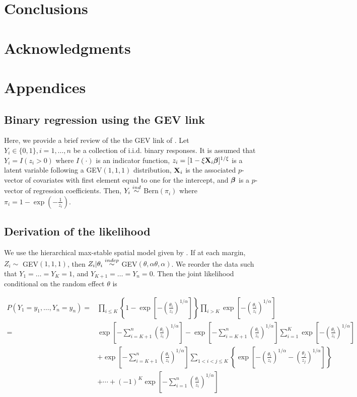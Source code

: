\documentclass[11pt]{article}
\begin{document}
\section{Conclusions}\label{rbs:conclusions}

\section*{Acknowledgments}

\appendix
\section{Appendices}
\subsection{Binary regression using the GEV link} \label{rba:rarebinary}
Here, we provide a brief review of the the GEV link of \citet{Wang2010}.
Let $Y_i \in \{0, 1\}, i = 1, \ldots, n$ be a collection of i.i.d. binary responses.
It is assumed that $Y_i = I(z_i > 0)$ where $I(\cdot)$ is an indicator function, $z_i = [1 - \xi \mbox{\bf X}_i \mbox{\boldmath $\beta$}]^{1 / \xi}$ is a latent variable following a GEV$(1, 1, 1)$ distribution, $\mbox{\bf X}_i$ is the associated $p$-vector of covariates with first element equal to one for the intercept, and $\mbox{\boldmath $\beta$}$ is a $p$-vector of regression coefficients.
Then, $Y_i \stackrel{ind}{\sim}$ Bern$(\pi_i)$ where $\pi_i= 1 - \exp \left( -\frac{ 1 }{ z_i } \right)$.


\subsection{Derivation of the likelihood} \label{rba:likelihoodderivation}
We use the hierarchical max-stable spatial model given by \citet{Reich2012}. If at each margin, $Z_i \sim $ GEV$(1,1,1)$, then $Z_i | \theta_i \stackrel{indep}{\sim} $ GEV$(\theta, \alpha \theta, \alpha)$. We reorder the data such that $Y_1=\ldots=Y_K=1$, and $Y_{K+1} = \ldots = Y_n = 0$. Then the joint likelihood conditional on the random effect $\theta$ is

\begin{align} \label{rbeq:joint_cond}
	P(Y_1=y_1,\ldots,Y_n=y_n) =& \prod_{ i \le K } \left\{ 1 - \exp \left[ - \left( \frac{ \theta_i }{ z_i } \right)^{ 1/\alpha} \right] \right \} \prod_{ i > K } \exp \left[ -\left( \frac{ \theta_i }{ z_i } \right)^{1/\alpha} \right] \nonumber \\[0.5em]
		=& \exp \left[ -\sum_{ i = K+1}^{ n }\left( \frac{ \theta_i }{ z_i } \right)^{1/\alpha} \right] - \exp \left[ -\sum_{ i = K+1}^{ n }\left( \frac{ \theta_i }{ z_i } \right)^{1/\alpha} \right] \sum_{ i = 1}^{K} \exp\left[ -\left( \frac{ \theta_i }{ z_i } \right)^{ 1/\alpha} \right] \nonumber\\
		&  + \exp \left[ -\sum_{ i = K+1}^{ n }\left( \frac{ \theta_i }{ z_i } \right)^{1/\alpha} \right] \sum_{ 1 < i < j \le K } \left\{ \exp \left[ - \left( \frac{ \theta_i }{ z_i } \right)^{ 1/\alpha} - \left( \frac{ \theta_j }{ z_j } \right)^{ 1/\alpha } \right] \right \} \nonumber \\[0.5em]
		& + \cdots + (-1)^K \exp\left[ - \sum_{ i = 1 }^{ n }\left( \frac{ \theta_i }{ z_i } \right)^{ 1/\alpha} \right]
\end{align}
\end{document}

